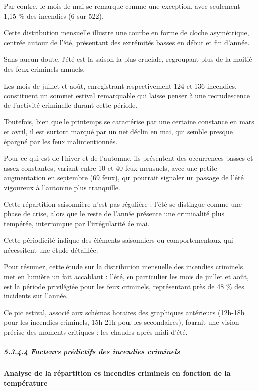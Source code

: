 \documentclass[
]{article}
\begin{document}
Par contre, le mois de mai se remarque comme une exception, avec
seulement 1,15 \% des incendies (6 sur 522).

Cette distribution mensuelle illustre une courbe en forme de cloche
asymétrique, centrée autour de l'été, présentant des extrémités basses
en début et fin d'année.

Sans aucun doute, l'été est la saison la plus cruciale, regroupant plus
de la moitié des feux criminels annuels.

Les mois de juillet et août, enregistrant respectivement 124 et 136
incendies, constituent un sommet estival remarquable qui laisse penser à
une recrudescence de l'activité criminelle durant cette période.

Toutefois, bien que le printemps se caractérise par une certaine
constance en mars et avril, il est surtout marqué par un net déclin en
mai, qui semble presque épargné par les feux malintentionnés.

Pour ce qui est de l'hiver et de l'automne, ils présentent des
occurrences basses et assez constantes, variant entre 10 et 40 feux
mensuels, avec une petite augmentation en septembre (69 feux), qui
pourrait signaler un passage de l'été vigoureux à l'automne plus
tranquille.

Cette répartition saisonnière n'est pas régulière : l'été se distingue
comme une phase de crise, alors que le reste de l'année présente une
criminalité plus tempérée, interrompue par l'irrégularité de mai.

Cette périodicité indique des éléments saisonniers ou comportementaux
qui nécessitent une étude détaillée.

Pour résumer, cette étude sur la distribution mensuelle des incendies
criminels met en lumière un fait accablant : l'été, en particulier les
mois de juillet et août, est la période privilégiée pour les feux
criminels, représentant près de 48 \% des incidents sur l'année.

Ce pic estival, associé aux schémas horaires des graphiques antérieurs
(12h-18h pour les incendies criminels, 15h-21h pour les secondaires),
fournit une vision précise des moments critiques : les chaudes
après-midi d'été.

\subparagraph{5.3.4.4 Facteurs prédictifs des incendies
criminels}\label{facteurs-pruxe9dictifs-des-incendies-criminels}

\textbf{Analyse de la répartition es incendies criminels en fonction de
la température}
\end{document}
